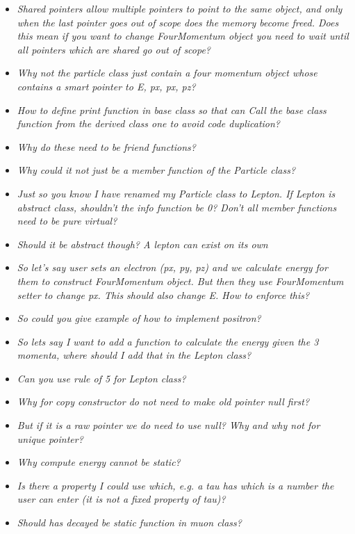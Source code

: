\documentclass[11pt, letterpaper]{article}
\begin{document}
\begin{itemize}
	\item \textit{Shared pointers allow multiple pointers to point to the same object, and only when the last pointer goes out of scope does the memory become freed. Does this mean if you want to change FourMomentum object you need to wait until all pointers which are shared go out of scope?}
	\item \textit{Why not the particle class just contain a four momentum object whose contains a smart pointer to E, px, px, pz?}
	\item \textit{How to define print function in base class so that can Call the base class function from the derived class one to avoid code duplication?}
	\item \textit{Why do these need to be friend functions?}
	\item \textit{Why could it not just be a member function of the Particle class?}
	\item \textit{Just so you know I have renamed my Particle class to Lepton. If Lepton is abstract class, shouldn't the info function be 0? Don't all member functions need to be pure virtual?}
	\item \textit{Should it be abstract though? A lepton can exist on its own}
	\item \textit{So let's say user sets an electron (px, py, pz) and we calculate energy for them to construct FourMomentum object. But then they use FourMomentum setter to change px. This should also change E. How to enforce this?}
	\item \textit{So could you give example of how to implement positron?}
	\item \textit{So lets say I want to add a function to calculate the energy given the 3 momenta, where should I add that in the Lepton class?}
	\item \textit{Can you use rule of 5 for Lepton class?}
	\item \textit{Why for copy constructor do not need to make old pointer null first?}
	\item \textit{But if it is a raw pointer we do need to use null? Why and why not for unique pointer?}
	\item \textit{Why compute energy cannot be static?}
	\item \textit{Is there a property I could use which, e.g. a tau has which is a number the user can enter (it is not a fixed property of tau)?}
	\item \textit{Should has decayed be static function in muon class?}

\end{itemize}
\end{document}
